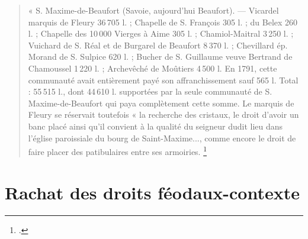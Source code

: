 \documentclass[12pt,a4paper]{report}
\begin{document}
\begin{quote}
	« S. Maxime-de-Beaufort (Savoie, aujourd’hui Beaufort). — Vicardel marquis de 
	Fleury 36\,705 l. ; Chapelle de S. François 305 l. ; du Belex 260 l. ; Chapelle 
	des 10\,000 Vierges à Aime 305 l. ; Chamiol-Maitral 3\,250 l. ; Vuichard de 
	S. Réal et de Burgarel de Beaufort 8\,370 l. ; Chevillard ép. Morand de 
	S. Sulpice 620 l. ; Bucher de S. Guillaume veuve Bertrand de Chamoussel 
	1\,220 l. ; Archevêché de Moûtiers 4\,500 l. En 1791, cette communauté avait 
	entièrement payé son affranchissement sauf 565 l. Total : 55\,515 l., dont 
	44\,610 l. supportées par la seule communauté de S. Maxime-de-Beaufort qui 
	paya complètement cette somme. 
	Le marquis de Fleury se réservait toutefois « la recherche des cristaux, le droit d'avoir un banc placé ainsi qu'il convient à la qualité du seigneur dudit lieu dans l'église paroissiale du bourg de Saint-Maxime..., comme encore le droit de faire placer des patibulaires entre ses armoiries.	\footcite[426]{Bruchet1908Abolition}
\end{quote}

\section{Rachat des droits féodaux-contexte}
\end{document}
